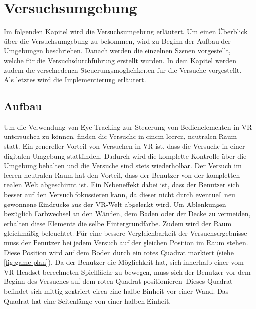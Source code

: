 
\chapter{Versuchsumgebung}
\label{section:versuchsumgebung}

Im folgenden Kapitel wird die Versuchsumgebung erläutert. Um einen Überblick über die Versuchsumgebung zu bekommen, wird zu Beginn der Aufbau der Umgebungen beschrieben. Danach werden die einzelnen Szenen vorgestellt, welche für die Versuchsdurchführung erstellt wurden. In dem Kapitel werden zudem die verschiedenen Steuerungsmöglichkeiten für die Versuche vorgestellt. Als letztes wird die Implementierung erläutert. 

\section{Aufbau}
Um die Verwendung von Eye-Tracking zur Steuerung von Bedienelementen in \ac{VR} untersuchen zu können, finden die Versuche in einem leeren, neutralen Raum statt. Ein genereller Vorteil von Versuchen in \ac{VR} ist, dass die Versuche in einer digitalen Umgebung stattfinden. Dadurch wird die komplette Kontrolle über die Umgebung behalten und die Versuche sind stets wiederholbar. Der Versuch im leeren neutralen Raum hat den Vorteil, dass der Benutzer von der kompletten realen Welt abgeschirmt ist. Ein Nebeneffekt dabei ist, dass der Benutzer sich besser auf den Versuch fokussieren kann, da dieser nicht durch eventuell neu gewonnene Eindrücke aus der \ac{VR}-Welt abgelenkt wird. Um Ablenkungen bezüglich Farbwechsel an den Wänden, dem Boden oder der Decke zu vermeiden, erhalten diese Elemente die selbe Hintergrundfarbe. Zudem wird der Raum gleichmäßig beleuchtet. Für eine bessere Vergleichbarkeit der Versuchsergebnisse muss der Benutzer bei jedem Versuch auf der gleichen Position im Raum stehen. Diese Position wird auf dem Boden durch ein rotes Quadrat markiert (siehe \autoref{fig:game-plan}). Da der Benutzer die Möglichkeit hat, sich innerhalb einer vom \ac{VR}-Headset berechneten Spielfläche zu bewegen, muss sich der Benutzer vor dem Beginn des Versuches auf dem roten Quadrat positionieren. Dieses Quadrat befindet sich mittig zentriert circa eine halbe Einheit vor einer Wand. Das Quadrat hat eine Seitenlänge von einer halben Einheit.

